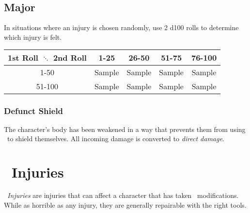 \begin{multicols}{2}

\end{multicols}
\subsection{Major}
In situations where an injury is chosen randomly, use 2 d100 rolls to determine which injury is felt.
\begin{center}
\begin{tabular}{c | c | c | c | c}
1st Roll $\ddots$ 2nd Roll & 1-25 & 26-50 & 51-75 & 76-100 \\
\hline
1-50 & Sample & Sample & Sample & Sample\\
\hline
51-100 & Sample & Sample & Sample & Sample\\
\end{tabular}
\end{center}
\begin{multicols}{2}
\subsubsection*{Defunct Shield}
The character's body has been weakened in a way that prevents them from using \ENful\ to shield themselves. All incoming damage is converted to \emph{direct damage}.

\end{multicols}

\section{\dieselt\ Injuries}\label{sec:dies_injuries}
\emph{\dieselt\ Injuries} are injuries that can affect a character that has taken \dieselt\ modifications. While as horrible as any injury, they are generally repairable with the right tools.
